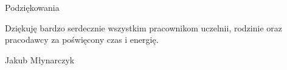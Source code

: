 \noindent
{\Large Podziękowania}
\bigskip

Dziękuję bardzo serdecznie wszystkim pracownikom uczelnii, rodzinie oraz pracodawcy za poświęcony czas i energię.

\bigskip

{\raggedleft
Jakub Młynarczyk

}

